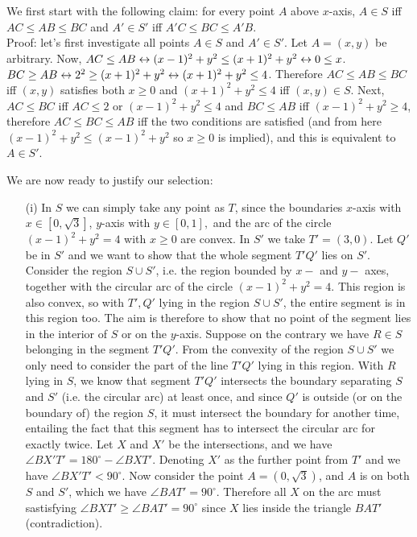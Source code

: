 \documentclass[11pt,a4paper]{article}
\begin{document}
\begin{itemize}
We first start with the following claim: 
for every point $A$ above $x$-axis, $A\in S$ iff $AC\le AB\le BC$ and $A'\in S'$ iff $A'C\le BC\le A'B$. \\
Proof: let's first investigate all points $A\in S$ and $A'\in S'$. 
Let $A=(x,y)$ be arbitrary. 
Now, $AC\le AB\leftrightarrow(x-1)^2+y^2\le  (x+1)^2+y^2\leftrightarrow 0\le x$. 
$BC\ge AB\leftrightarrow 2^2\ge (x+1)^2+y^2\leftrightarrow (x+1)^2+y^2\le 4$. 
Therefore $AC\le AB\le BC$ iff $(x,y)$ satisfies both $x\ge 0$ and $(x+1)^2+y^2\le 4$ iff $(x,y)\in S$. 
Next, $AC\le BC$ iff 
$AC\le 2$ or $(x-1)^2+y^2\le 4$ 
and $BC\le AB$ iff
$(x-1)^2+y^2\ge 4$, 
therefore $AC\le BC\le AB$ iff the two conditions are satisfied (and from here $(x-1)^2+y^2\le (x-1)^2+y^2$ so $x\ge 0$ is implied), 
and this is equivalent to $A\in S'$. 

We are now ready to justify our selection: 
\begin{itemize}
\item[(i)]
In $S$ we can simply take any point as $T$, since the boundaries $x$-axis with $x\in [0, \sqrt{3}]$, $y$-axis with $y\in [0, 1], $ and the arc of the circle $(x-1)^2+y^2=4$ with $x\ge 0$ are convex. 
In $S'$ we take $T'=(3,0)$. 
Let $Q'$ be in $S'$ and we want to show that the whole segment $T'Q'$ lies on $S'$. 
Consider the region $S\cup S'$, i.e. the region bounded by $x-$ and $y-$ axes, together with the circular arc of the circle $(x-1)^2+y^2=4$. 
This region is also convex, so with $T', Q'$ lying in the region $S\cup S'$, the entire segment is in this region too. 
The aim is therefore to show that no point of the segment lies in the interior of $S$ or on the $y$-axis. 
Suppose on the contrary we have $R\in S$ belonging in the segment $T'Q'$. 
From the convexity of the region $S\cup S'$ we only need to consider the part of the line $T'Q'$ lying in this region. 
With $R$ lying in $S$, we know that segment $T'Q'$ intersects the boundary separating $S$ and $S'$ (i.e. the circular arc) at least once, 
and since $Q'$ is outside (or on the boundary of) the region $S$, it must intersect the boundary for another time, 
entailing the fact that this segment has to intersect the circular arc for exactly twice. 
Let $X$ and $X'$ be the intersections, and we have 
$\angle BX'T'=180^{\circ}-\angle BXT'$. 
Denoting $X'$ as the further point from $T'$ and we have $\angle BX'T'<90^{\circ}$. 
Now consider the point $A=(0, \sqrt{3})$, and $A$ is on both $S$ and $S'$, which we have $\angle BAT'=90^{\circ}$. 
Therefore all $X$ on the arc must sastisfying $\angle BXT'\ge \angle BAT'=90^{\circ}$ since $X$ lies inside the triangle $BAT'$ 
(contradiction).


\end{itemize}
\end{itemize}
\end{document}
